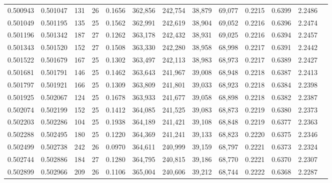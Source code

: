 \begin{tabular}{rrrrrrrrrrrrr}
0.500943 & 0.501047 &   131 &  26 &                                     0.1656 & 362,856 & 242,754 &  38,879 &  69,077 & 0.2215 & 0.6399 & 2.2486 \\
0.501049 & 0.501195 &   135 &  25 &                                     0.1562 & 362,991 & 242,619 &  38,904 &  69,052 & 0.2216 & 0.6396 & 2.2474 \\
0.501196 & 0.501342 &   187 &  27 &                                     0.1262 & 363,178 & 242,432 &  38,931 &  69,025 & 0.2216 & 0.6394 & 2.2457 \\
0.501343 & 0.501520 &   152 &  27 &                                     0.1508 & 363,330 & 242,280 &  38,958 &  68,998 & 0.2217 & 0.6391 & 2.2442 \\
0.501522 & 0.501679 &   167 &  25 &                                     0.1302 & 363,497 & 242,113 &  38,983 &  68,973 & 0.2217 & 0.6389 & 2.2427 \\
0.501681 & 0.501791 &   146 &  25 &                                     0.1462 & 363,643 & 241,967 &  39,008 &  68,948 & 0.2218 & 0.6387 & 2.2413 \\
0.501797 & 0.501921 &   166 &  25 &                                     0.1309 & 363,809 & 241,801 &  39,033 &  68,923 & 0.2218 & 0.6384 & 2.2398 \\
0.501925 & 0.502067 &   124 &  25 &                                     0.1678 & 363,933 & 241,677 &  39,058 &  68,898 & 0.2218 & 0.6382 & 2.2387 \\
0.502074 & 0.502199 &   152 &  25 &                                     0.1412 & 364,085 & 241,525 &  39,083 &  68,873 & 0.2219 & 0.6380 & 2.2373 \\
0.502203 & 0.502286 &   104 &  25 &                                     0.1938 & 364,189 & 241,421 &  39,108 &  68,848 & 0.2219 & 0.6377 & 2.2363 \\
0.502288 & 0.502495 &   180 &  25 &                                     0.1220 & 364,369 & 241,241 &  39,133 &  68,823 & 0.2220 & 0.6375 & 2.2346 \\
0.502499 & 0.502738 &   242 &  26 &                                     0.0970 & 364,611 & 240,999 &  39,159 &  68,797 & 0.2221 & 0.6373 & 2.2324 \\
0.502744 & 0.502886 &   184 &  27 &                                     0.1280 & 364,795 & 240,815 &  39,186 &  68,770 & 0.2221 & 0.6370 & 2.2307 \\
0.502899 & 0.502966 &   209 &  26 &                                     0.1106 & 365,004 & 240,606 &  39,212 &  68,744 & 0.2222 & 0.6368 & 2.2287 \\

\end{tabular}
